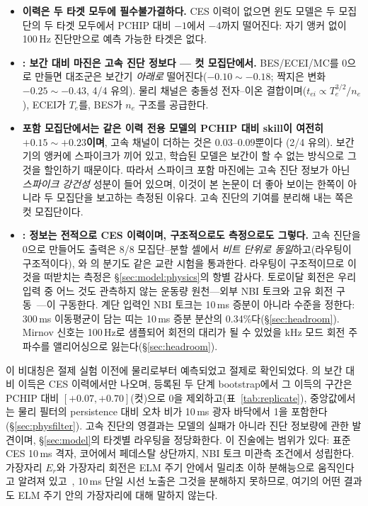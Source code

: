 \documentclass[10pt,a4paper]{article}
\begin{document}
\begin{itemize}
  \item \textbf{이력은 두 타겟 모두에 필수불가결하다.} CES 이력이 없으면 윈도
        모델은 두 모집단의 두 타겟 모두에서 PCHIP 대비 $-1$에서 $-4$까지
        떨어진다: 자기 앵커 없이 100\,Hz 진단만으로 예측 가능한 타겟은 없다.
  \item \textbf{\Ti{}: 보간 대비 마진은 고속 진단 정보다 --- 컷 모집단에서.}
        BES/ECEI/MC를 0으로 만들면 대조군은 보간기 \emph{아래로}
        떨어진다($-0.10\sim-0.18$; 짝지은 변화 $-0.25\sim-0.43$, 4/4 유의).
        물리 채널은 충돌성 전자--이온 결합이며($t_{ei}\propto T_e^{3/2}/n_e$),
        ECEI가 $T_e$를, BES가 $n_e$ 구조를 공급한다.
  \item \textbf{포함 모집단에서는 같은 이력 전용 모델의 PCHIP 대비 skill이
        여전히 $+0.15\sim+0.23$이며}, 고속 채널이 더하는 것은 $0.03$--$0.09$뿐이다
        (2/4 유의). 보간기의 앵커에 스파이크가 끼어 있고, 학습된 모델은 보간이
        할 수 없는 방식으로 그것을 할인하기 때문이다. 따라서 스파이크 포함
        마진에는 고속 진단 정보가 아닌 \emph{스파이크 강건성} 성분이 들어 있으며,
        이것이 본 논문이 더 좋아 보이는 한쪽이 아니라 두 모집단을 보고하는 측정된
        이유다. 고속 진단의 기여를 분리해 내는 쪽은 컷 모집단이다.
  \item \textbf{\Vrot{}: 정보는 전적으로 CES 이력이며, 구조적으로도 측정으로도
        그렇다.} 고속 진단을 0으로 만들어도 \Vrot{} 출력은 8/8 모집단--분할
        셀에서 \emph{비트 단위로 동일}하고(라우팅이 구조적이다), \seqv{}와
        \bthree{}의 \Vrot{} 분기도 같은 교란 시험을 통과한다. 라우팅이 구조적이므로
        이것을 떠받치는 측정은 \S\ref{sec:model:physics}의 항별 감사다. 토로이달
        회전은 우리 입력 중 어느 것도 관측하지 않는 운동량 원천---외부 NBI 토크와
        고유 회전 구동~\citep{Rice2007IntermachineComparison}---이 구동한다. 계단
        입력인 NBI 토크는 10\,ms 증분이 아니라 수준을 정한다: 300\,ms 이동평균이 담는
        띠는 10\,ms \Vrot{} 증분 분산의 0.34\%다(\S\ref{sec:headroom}). Mirnov
        신호는 100\,Hz로 샘플되어 회전의 대리가 될 수 있었을 kHz 모드 회전
        주파수를 앨리어싱으로 잃는다(\S\ref{sec:headroom}).
\end{itemize}

이 비대칭은 절제 실험 이전에 물리로부터 예측되었고 절제로 확인되었다. \Vrot{}의
보간 대비 이득은 CES 이력에서만 나오며, 등록된 두 단계 bootstrap에서 그 이득의
구간은 PCHIP 대비 $[+0.07, +0.70]$(컷)으로 0을 제외하고(표~\ref{tab:replicate}),
중앙값에서는 물리 필터의 persistence 대비 오차 비가 10\,ms 광자 바닥에서 1을
포함한다(\S\ref{sec:physfilter}). 고속 진단의 영결과는 모델의 실패가 아니라 진단 정보량에 관한 발견이며,
\S\ref{sec:model}의 타겟별 라우팅을 정당화한다. 이 진술에는 범위가 있다: 표준 CES 10\,ms 격자, 코어에서
페데스탈 상단까지, NBI 토크 미관측 조건에서 성립한다. 가장자리 $E_r$와 가장자리
회전은 ELM 주기 안에서 밀리초 이하 분해능으로 움직인다고 알려져
있고~\citep{Viezzer2020Dynamics,Cavedon2017Pedestal}, 10\,ms 단일 시선 노출은 그것을
분해하지 못하므로, 여기의 어떤 결과도 ELM 주기 안의 가장자리에 대해 말하지 않는다.
\end{document}
